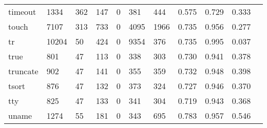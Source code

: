 \begin{longtable}{lp{1.10cm}p{1.10cm}p{1.10cm}p{1.10cm}p{1.10cm}p{1.10cm}p{1.10cm}p{1.10cm}p{1.10cm}p{1.10cm}}
timeout   &                   1334 &                                362 &                               147 &                                0 &                               381 &                             444 &                             0.575 &                                 0.729 &                               0.333 \\
touch     &                   7107 &                                313 &                               733 &                                0 &                              4095 &                            1966 &                             0.735 &                                 0.956 &                               0.277 \\
tr        &                  10204 &                                 50 &                               424 &                                0 &                              9354 &                             376 &                             0.735 &                                 0.995 &                               0.037 \\
true      &                    801 &                                 47 &                               113 &                                0 &                               338 &                             303 &                             0.730 &                                 0.941 &                               0.378 \\
truncate  &                    902 &                                 47 &                               141 &                                0 &                               355 &                             359 &                             0.732 &                                 0.948 &                               0.398 \\
tsort     &                    876 &                                 47 &                               132 &                                0 &                               373 &                             324 &                             0.727 &                                 0.946 &                               0.370 \\
tty       &                    825 &                                 47 &                               133 &                                0 &                               341 &                             304 &                             0.719 &                                 0.943 &                               0.368 \\
uname     &                   1274 &                                 55 &                               181 &                                0 &                               343 &                             695 &                             0.783 &                                 0.957 &                               0.546 \\

\end{longtable}
